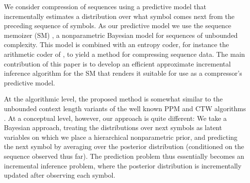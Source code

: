 

We consider compression of sequences using a predictive model
that incrementally estimates a distribution over what symbol comes next
from the preceding sequence of symbols.  
As our predictive model we use the sequence memoizer (SM) \citep{wood2009sms},
a nonparametric Bayesian model for sequences of unbounded complexity. This
model is combined with an entropy coder, for instance the arithmetic coder of 
\citet{witten1987acd}, to yield a method for compressing sequence data.
The main contribution of this paper is to develop an efficient
approximate incremental inference algorithm for the SM that renders it
suitable for use as a compressor's predictive model.  



At the algorithmic level, the proposed method is somewhat similar to the unbounded context length variants of the well known PPM and CTW algorithms 
\citep{cleary95unboundedlength,ctwextensions}. At a conceptual level, however,
our approach is quite different: We take a Bayesian approach, treating the distributions over next symbols as latent variables on which we place a
hierarchical nonparametric prior, and predicting the next symbol by
averaging over the posterior distribution (conditioned on the sequence observed thus far). The prediction problem thus essentially becomes an incremental inference problem, where the posterior distribution is incrementally updated after observing each symbol.



